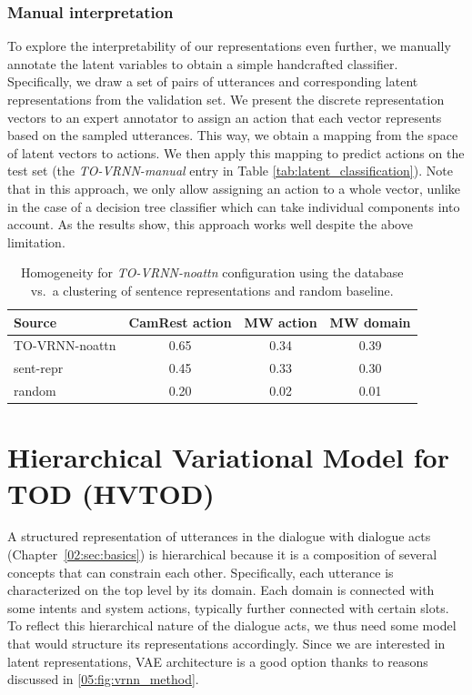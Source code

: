 \subsubsection{Manual interpretation}
\label{sec:manual}
To explore the interpretability of our representations even further, we manually annotate the latent variables to obtain a simple handcrafted classifier.
Specifically, we draw a set of pairs of utterances and corresponding latent representations from the validation set.
We present the discrete representation vectors to an expert annotator to assign an action that each vector represents based on the sampled utterances.
This way, we obtain a mapping from the space of latent vectors to actions.
We then apply this mapping to predict actions on the test set (the \textit{TO-VRNN-manual} entry in Table \ref{tab:latent_classification}).
Note that in this approach, we only allow assigning an action to a whole vector, unlike in the case of a decision tree classifier which can take individual components into account.
As the results show, this approach works well despite the above limitation.

\begin{table}[tp]
    \centering\small
    
\begin{tabular}{l|c|c|c}
      \toprule
      \textbf{Source} &\textbf{ CamRest action} & \textbf{MW action} & \textbf{MW domain} \\
      \midrule
      TO-VRNN-noattn & 0.65 & 0.34 & 0.39 \\
      sent-repr & 0.45 & 0.33 & 0.30 \\
      random & 0.20 & 0.02 & 0.01 \\
      \bottomrule
  \end{tabular}
  \caption{Homogeneity for \emph{TO-VRNN-noattn} configuration using the database vs.~a clustering of sentence representations and random baseline.}
  \label{tab:homo}
\end{table}

\section{Hierarchical Variational Model for TOD (HVTOD)}
A structured representation of utterances in the dialogue with dialogue acts (Chapter~\ref{02:sec:basics}) is hierarchical because it is a composition of several concepts that can constrain each other.
Specifically, each utterance is characterized on the top level by its domain.
Each domain is connected with some intents and system actions, typically further connected with certain slots.
To reflect this hierarchical nature of the dialogue acts, we thus need some model that would structure its representations accordingly.
Since we are interested in latent representations, VAE architecture is a good option thanks to reasons discussed in \ref{05:fig:vrnn_method}.

